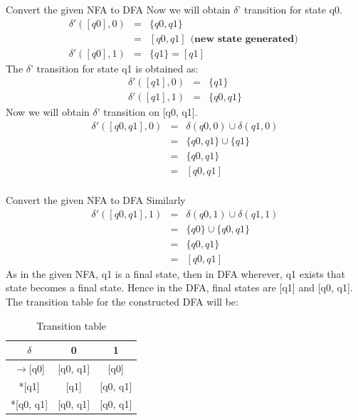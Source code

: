 \documentclass{beamer}
\begin{document}
\begin{frame}{Convert the given NFA to DFA}
Now we will obtain $\delta$' transition for state q0.
\begin{eqnarray*}
	\delta'([q0], 0) &=& \{q0, q1\}  \\
	&=& [q0, q1]      \ \  \textbf{(new state generated)  }\\
	\delta'([q0], 1) &=& \{q1\} = [q1]  
\end{eqnarray*}
The $\delta$' transition for state q1 is obtained as:
\begin{eqnarray*}
\delta'([q1], 0) &=& \{q1\} \\ 
\delta'([q1], 1) &=& \{q0, q1\}  
\end{eqnarray*}
Now we will obtain $\delta$' transition on [q0, q1].
\begin{eqnarray*}
	\delta'([q0, q1], 0) &=& \delta(q0, 0) \cup \delta(q1, 0)  \\
	&=& \{q0, q1\} \cup \{q1\}\\  
	&=& \{q0, q1\}\\  
	&=& [q0, q1]\\  
\end{eqnarray*}
\end{frame}
\begin{frame}{Convert the given NFA to DFA}
Similarly
\begin{eqnarray*}
	\delta'([q0, q1], 1) &=& \delta(q0, 1) \cup \delta(q1, 1)  \\
	&=& \{q0\} \cup \{q0, q1\}  \\
	&=& \{q0, q1\}  \\
	&=& [q0, q1]  
\end{eqnarray*}
As in the given NFA, q1 is a final state, then in DFA wherever, q1 exists that state becomes a final state. Hence in the DFA, final states are [q1] and [q0, q1].\\
The transition table for the constructed DFA will be:
\begin{table}
	\begin{tabular}{c||c|c}
		$\delta$&0&1\\
		\hline
		\hline
		$\rightarrow$[q0]&[q0, q1]&[q0]\\
			\hline
		*[q1]&[q1]&[q0, q1]\\
			\hline
		*[q0, q1]&[q0, q1]&[q0, q1]
	\end{tabular}
\caption{Transition table}
\end{table}
\end{frame}
\end{document}
